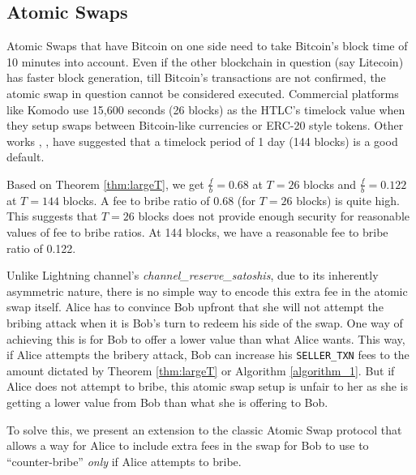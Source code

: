 \documentclass[runningheads]{llncs}
\newcommand{\sellertxn}{\texttt{SELLER\_TXN}}
\begin{document}
\subsection{Atomic Swaps}
Atomic Swaps that have Bitcoin on one side need to take Bitcoin's block time of 10 minutes into account. Even if the other blockchain in question (say Litecoin) has faster block generation, till Bitcoin's transactions are not confirmed, the atomic swap in question cannot be considered executed. Commercial platforms like Komodo \cite{komodo} use 15,600 seconds (26 blocks) as the HTLC's timelock value when they setup swaps between Bitcoin-like currencies or ERC-20 style tokens. Other works \cite{atomic_swaps_american_call_options}, \cite{atomic_swaps_bitmex}, \cite{htlcs_considered_harmful} have suggested that a timelock period of 1 day (144 blocks) is a good default. 

Based on Theorem \ref{thm:largeT}, we get $\frac{f}{b} = 0.68$ at $T = 26$ blocks and $\frac{f}{b} = 0.122$ at $T = 144$ blocks. A fee to bribe ratio of 0.68 (for $T = 26$ blocks) is quite high. This suggests that $T = 26$ blocks does not provide enough security for reasonable values of fee to bribe ratios. At 144 blocks, we have a reasonable fee to bribe ratio of 0.122. 

Unlike Lightning channel's \emph{channel\_reserve\_satoshis}, due to its inherently asymmetric nature, there is no simple way to encode this extra fee in the atomic swap itself. Alice has to convince Bob upfront that she will not attempt the bribing attack when it is Bob's turn to redeem his side of the swap. One way of achieving this is for Bob to offer a lower value than what Alice wants. This way, if Alice attempts the bribery attack, Bob can increase his \sellertxn{} fees to the amount dictated by Theorem \ref{thm:largeT} or Algorithm \ref{algorithm_1}. But if Alice does not attempt to bribe, this atomic swap setup is unfair to her as she is getting a lower value from Bob than what she is offering to Bob.

To solve this, we present an extension to the classic Atomic Swap protocol that allows a way for Alice to include extra fees in the swap for Bob to use to ``counter-bribe'' \textit{only} if Alice attempts to bribe.
\noindent
\end{document}
